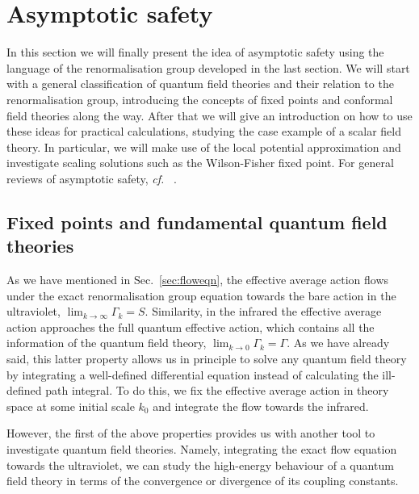 \documentclass[11pt]{book}
\newcommand\cf{\textit{cf.}\ }
\numberwithin{equation}{chapter}
\begin{document}
\section{Asymptotic safety}

In this section we will finally present the idea of asymptotic safety
using the language of the renormalisation group developed in the last
section. We will start with a general classification of quantum
field theories and their relation to the renormalisation group,
introducing the concepts of fixed points and conformal field
theories along the way. After that we will give an introduction
on how to use these ideas for practical calculations, studying
the case example of a scalar field theory. In particular,
we will make use of the local potential approximation and
investigate scaling solutions such as the Wilson-Fisher fixed point.
For general reviews of asymptotic safety, \cf
\cite{
  Niedermaier:2006wt,
  Niedermaier:2006ns,
  Litim:2008tt,
  Litim:2011cp,
  Percacci:2007sz,
  Reuter:2012id,
  Reuter:2012xf,
  Nagy:2012ef
}.


\subsection{Fixed points and fundamental quantum field theories}

As we have mentioned in Sec.~\ref{sec:floweqn}, the effective
average action flows under the exact renormalisation group equation
towards the bare action in the ultraviolet,
$\lim_{k \rightarrow \infty} \Gamma_k = S$. Similarity, in the infrared
the effective average action approaches the full quantum effective
action, which contains all the information of the quantum field theory,
$\lim_{k \rightarrow 0} \Gamma_k = \Gamma$. As we have already said,
this latter property allows us in principle to solve any
quantum field theory by
integrating a well-defined differential equation instead of
calculating the ill-defined path integral. To do this, we fix
the effective average action in theory space at some initial scale $k_0$
and integrate the flow towards the infrared.

However, the first of the above properties provides us with another
tool to investigate quantum field theories. Namely, integrating
the exact flow equation towards the ultraviolet, we can study
the high-energy behaviour of a quantum field theory in terms of
the convergence or divergence of its coupling constants.
\end{document}
